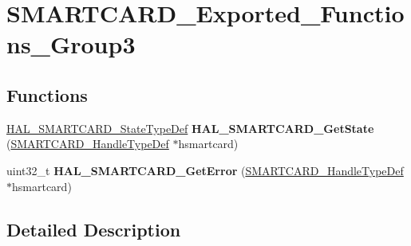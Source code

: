 \hypertarget{group___s_m_a_r_t_c_a_r_d___exported___functions___group3}{}\section{S\+M\+A\+R\+T\+C\+A\+R\+D\+\_\+\+Exported\+\_\+\+Functions\+\_\+\+Group3}
\label{group___s_m_a_r_t_c_a_r_d___exported___functions___group3}
\subsection*{Functions}
\begin{DoxyCompactItemize}
\item 
\mbox{\label{group___s_m_a_r_t_c_a_r_d___exported___functions___group3_gaf0a38dae4b1916b03962eea2ec6a0162}} 
\hyperlink{group___s_m_a_r_t_c_a_r_d___exported___types_ga79d6a3b95636861dcfd70913746e087e}{H\+A\+L\+\_\+\+S\+M\+A\+R\+T\+C\+A\+R\+D\+\_\+\+State\+Type\+Def} {\bfseries H\+A\+L\+\_\+\+S\+M\+A\+R\+T\+C\+A\+R\+D\+\_\+\+Get\+State} (\hyperlink{struct_s_m_a_r_t_c_a_r_d___handle_type_def}{S\+M\+A\+R\+T\+C\+A\+R\+D\+\_\+\+Handle\+Type\+Def} $\ast$hsmartcard)
\item 
\mbox{\label{group___s_m_a_r_t_c_a_r_d___exported___functions___group3_gae6250b49f6f51e1b2184a20b92f87bab}} 
uint32\+\_\+t {\bfseries H\+A\+L\+\_\+\+S\+M\+A\+R\+T\+C\+A\+R\+D\+\_\+\+Get\+Error} (\hyperlink{struct_s_m_a_r_t_c_a_r_d___handle_type_def}{S\+M\+A\+R\+T\+C\+A\+R\+D\+\_\+\+Handle\+Type\+Def} $\ast$hsmartcard)
\end{DoxyCompactItemize}


\subsection{Detailed Description}
